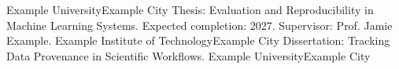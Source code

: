   {Example University}{Example City}{
  Thesis: Evaluation and Reproducibility in Machine Learning Systems.
  Expected completion: 2027. Supervisor: Prof. Jamie Example.
}
  {Example Institute of Technology}{Example City}{
  Dissertation: Tracking Data Provenance in Scientific Workflows.
}
  {Example University}{Example City}{}
